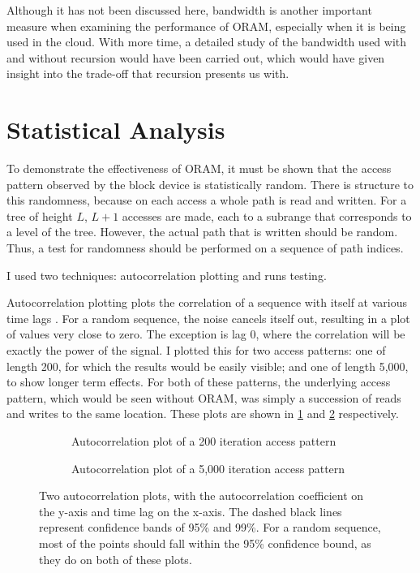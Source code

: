 \documentclass[12pt,a4paper,twoside,openright]{report}
\begin{document}
Although it has not been discussed here, bandwidth is another important measure when examining the performance of ORAM, especially when it is being used in the cloud. With more time, a detailed study of the bandwidth used with and without recursion would have been carried out, which would have given insight into the trade-off that recursion presents us with.

\section{Statistical Analysis}
\label{sec:statisticalAnalysis}

To demonstrate the effectiveness of ORAM, it must be shown that the access pattern observed by the block device is statistically random. There is structure to this randomness, because on each access a whole path is read and written. For a tree of height $L$, $L+1$ accesses are made, each to a subrange that corresponds to a level of the tree. However, the actual path that is written should be random. Thus, a test for randomness should be performed on a sequence of path indices.

I used two techniques: autocorrelation plotting and runs testing.

Autocorrelation plotting plots the correlation of a sequence with itself at various time lags \cite{nistautocorr}. For a random sequence, the noise cancels itself out, resulting in a plot of values very close to zero. The exception is lag 0, where the correlation will be exactly the power of the signal. I plotted this for two access patterns: one of length 200, for which the results would be easily visible; and one of length 5,000, to show longer term effects. For both of these patterns, the underlying access pattern, which would be seen without ORAM, was simply a succession of reads and writes to the same location. These plots are shown in \cref{fig:shortAutocorr} and \cref{fig:longAutocorr} respectively.

\begin{figure}
    \centering
    \begin{subfigure}{\textwidth}
        \centering
        
        \caption{Autocorrelation plot of a 200 iteration access pattern}
        \label{fig:shortAutocorr}
    \end{subfigure}
    \begin{subfigure}{\textwidth}
        \centering
        
        \caption{Autocorrelation plot of a 5,000 iteration access pattern}
        \label{fig:longAutocorr}
    \end{subfigure}
    \caption{Two autocorrelation plots, with the autocorrelation coefficient on the y-axis and time lag on the x-axis. The dashed black lines represent confidence bands of 95\% and 99\%. For a random sequence, most of the points should fall within the 95\% confidence bound, as they do on both of these plots.}
    \label{fig:autocorr}
\end{figure}
\end{document}
